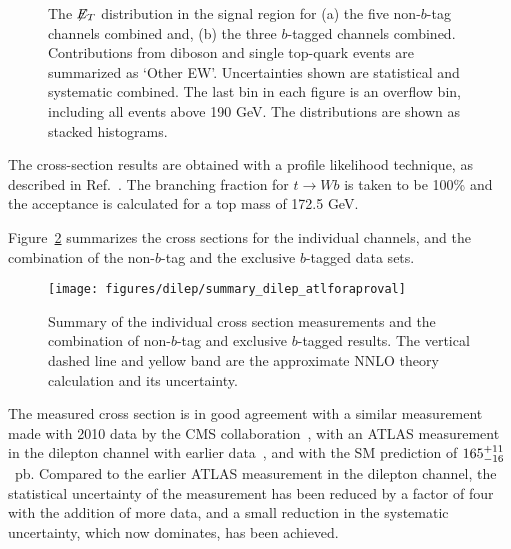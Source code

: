 \begin{figure*}
  \centering
  \caption{
    The $\not\!\!{E_{T}}$ distribution in the signal region for (a) the five
    non-$b$-tag channels combined and, (b) the three $b$-tagged channels
    combined.  Contributions from diboson and single top-quark events
    are summarized as `Other EW'. Uncertainties shown are statistical
    and systematic combined. The last bin in each figure is an
    overflow bin, including all events above 190 GeV. The distributions
    are shown as stacked histograms.}
  \label{f:ll_met_ht}
\end{figure*}


The cross-section results are obtained with a profile likelihood
technique, as described in Ref.~\cite{ATL-CONF-2011-034}. The
branching fraction for $t\rightarrow Wb$ is taken to be 100\% and
the acceptance is calculated for a top mass of 172.5 GeV.


Figure~\ref{fig:XsecSummary} summarizes the cross sections
for the individual channels,  and the combination of the non-$b$-tag and
the exclusive $b$-tagged data sets.

\begin{figure}[!h]
\centering
\texttt{[image: figures/dilep/summary\_dilep\_atlforaproval]}
    \caption{Summary of the individual cross section measurements and the combination of non-$b$-tag and
    exclusive $b$-tagged results. The vertical dashed line and yellow band are the approximate NNLO theory calculation and its uncertainty.}
    \label{fig:XsecSummary}
\end{figure}

The measured cross section is in good agreement with a similar
measurement made with 2010 data by the CMS
collaboration~\cite{Chatrchyan:2011nb}, %
with an ATLAS measurement in the dilepton channel with earlier
data~\cite{ATL-CONF-2011-034}, and with the SM
prediction of
$165^{+11}_{-16}$~pb. Compared to the earlier ATLAS measurement
in the dilepton channel, the statistical uncertainty of the
measurement has been reduced by a factor of four with the addition
of more data, and a small reduction in the systematic uncertainty,
which now dominates, has been achieved.



